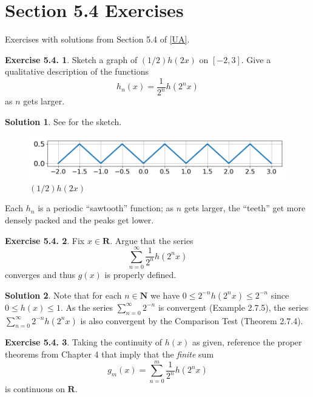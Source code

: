 \documentclass[12pt]{article}
\theoremstyle{definition}
\theoremstyle{exercise}
\newtheorem{exercise}{Exercise 5.4.}
\theoremstyle{solution}
\newtheorem*{solution}{Solution}
\newcommand{\N}{\mathbf{N}}
\newcommand{\R}{\mathbf{R}}
\begin{document}
\section{Section 5.4 Exercises}

Exercises with solutions from Section 5.4 of \hyperlink{ua}{[UA]}.

\begin{exercise}
\label{ex:1}
    Sketch a graph of \( (1/2)h(2x) \) on \( [-2, 3] \). Give a qualitative description of the functions
    \[
        h_n(x) = \frac{1}{2^n} h(2^n x)
    \]
    as \( n \) gets larger.
\end{exercise}

\begin{solution}
    See  for the sketch.
    \begin{figure}[ht]
        \centering
        \includegraphics[width=14cm]{UA_Section_5_4_Figure_1.png}
        \caption{\( (1/2) h(2x) \)}
        \label{fig:1}
    \end{figure}
    Each \( h_n \) is a periodic ``sawtooth'' function; as \( n \) gets larger, the ``teeth'' get more densely packed and the peaks get lower.
\end{solution}

\begin{exercise}
\label{ex:2}
    Fix \( x \in \R \). Argue that the series
    \[
        \sum_{n=0}^{\infty} \frac{1}{2^n} h(2^n x)
    \]
    converges and thus \( g(x) \) is properly defined.
\end{exercise}

\begin{solution}
    Note that for each \( n \in \N \) we have \( 0 \leq 2^{-n} h(2^n x) \leq 2^{-n} \) since \( 0 \leq h(x) \leq 1 \). As the series \( \sum_{n=0}^{\infty} 2^{-n} \) is convergent (Example 2.7.5), the series \( \sum_{n=0}^{\infty} 2^{-n} h(2^n x) \) is also convergent by the Comparison Test (Theorem 2.7.4).
\end{solution}

\begin{exercise}
\label{ex:3}
    Taking the continuity of \( h(x) \) as given, reference the proper theorems from Chapter 4 that imply that the \textit{finite} sum
    \[
        g_m(x) = \sum_{n=0}^m \frac{1}{2^n} h(2^n x)
    \]
    is continuous on \( \R \).
\end{exercise}
\end{document}
